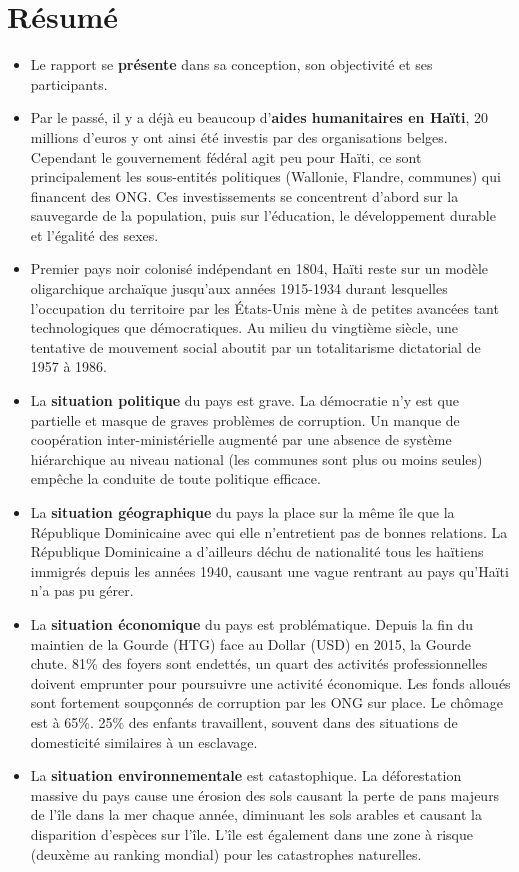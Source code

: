 \documentclass[a4paper, 11pt]{article}
\begin{document}
\section*{Résumé}
\begin{itemize}
  \item Le rapport se \textbf{présente} dans sa conception, son objectivité et ses participants.
  \item Par le passé, il y a déjà eu beaucoup d'\textbf{aides humanitaires en Haïti}, 20 millions d'euros y ont ainsi été investis par des organisations belges. Cependant le gouvernement fédéral agit peu pour Haïti, ce sont principalement les sous-entités politiques (Wallonie, Flandre, communes) qui financent des ONG. Ces investissements se concentrent d'abord sur la sauvegarde de la population, puis sur l'éducation, le développement durable et l'égalité des sexes.
  \item Premier pays noir colonisé indépendant en 1804, Haïti reste sur un modèle oligarchique archaïque jusqu'aux années 1915-1934 durant lesquelles l'occupation du territoire par les \'Etats-Unis mène à de petites avancées tant technologiques que démocratiques. Au milieu du vingtième siècle, une tentative de mouvement social aboutit par un totalitarisme dictatorial de 1957 à 1986.
  \item La \textbf{situation politique} du pays est grave. La démocratie n'y est que partielle et masque de graves problèmes de corruption. Un manque de coopération inter-ministérielle augmenté par une absence de système hiérarchique au niveau national (les communes sont plus ou moins seules) empêche la conduite de toute politique efficace.
  \item La \textbf{situation géographique} du pays la place sur la même île que la République Dominicaine avec qui elle n'entretient pas de bonnes relations. La République Dominicaine a d'ailleurs déchu de nationalité tous les haïtiens immigrés depuis les années 1940, causant une vague rentrant au pays qu'Haïti n'a pas pu gérer.
  \item La \textbf{situation économique} du pays est problématique. Depuis la fin du maintien de la Gourde (HTG) face au Dollar (USD) en 2015, la Gourde chute. 81\% des foyers sont endettés, un quart des activités professionnelles doivent emprunter pour poursuivre une activité économique. Les fonds alloués sont fortement soupçonnés de corruption par les ONG sur place. Le chômage est à 65\%. 25\% des enfants travaillent, souvent dans des situations de domesticité similaires à un esclavage.
  \item La \textbf{situation environnementale} est catastophique. La déforestation massive du pays cause une érosion des sols causant la perte de pans majeurs de l'île dans la mer chaque année, diminuant les sols arables et causant la disparition d'espèces sur l'île. L'île est également dans une zone à risque (deuxème au ranking mondial) pour les catastrophes naturelles.

\end{itemize}
\end{document}
